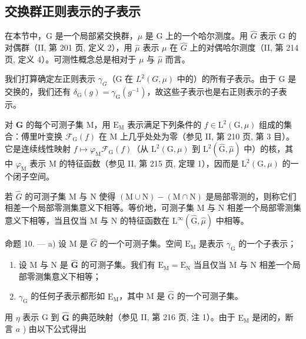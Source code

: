 \subsection{交换群正则表示的子表示}

在本节中，G 是一个局部紧交换群，\(\mu\) 是 G 上的一个哈尔测度。用 \(\hat{G}\) 表示 G 的对偶群（II, 第 201 页, 定义 2），用 \(\hat{\mu}\) 表示 \(\mu\) 在 \(\hat{G}\) 上的对偶哈尔测度（II, 第 214 页, 定义 4）。可测性概念总是相对于 \(\mu\) 与 \(\hat{\mu}\) 而言。

我们打算确定左正则表示 \(\gamma_{G}\)（G 在 \(L^{2}(G,\mu)\) 中的）的所有子表示。由于 G 是交换的，我们还有 \(\delta_{\mathrm{G}}(g)=\gamma_{\mathrm{G}}(g^{-1})\)，故这些子表示也是右正则表示的子表示。

对 \(\widehat{\mathbf{G}}\) 的每个可测子集 M，用 \(\mathrm{E_M}\) 表示满足下列条件的 \(f \in \mathrm{L}^2 (\mathrm{G},\mu)\) 组成的集合：傅里叶变换 \(\mathcal{F}_{\mathrm{G}}(f)\) 在 M 上几乎处处为零（参见 II, 第 210 页, 第 3 目）。它是连续线性映射 \(f \mapsto \varphi_{\mathrm{M}}\mathcal{F}_{\mathrm{G}}(f)\)（从 \(\mathrm{L}^2 (\mathrm{G},\mu)\) 到 \(\mathrm{L}^2 (\widehat{\mathrm{G}},\widehat{\mu})\) 中）的核，其中 \(\varphi_{\mathrm{M}}\) 表示 M 的特征函数（参见 II, 第 215 页, 定理 1），因而是 \(\mathrm{L}^2 (\mathrm{G},\mu)\) 的一个闭子空间。

若 \(\widehat{G}\) 的可测子集 M 与 N 使得 \((\mathrm{M} \cup \mathrm{N}) - (\mathrm{M} \cap \mathrm{N})\) 是局部零测的，则称它们相差一个局部零测集意义下相等。等价地，可测子集 M 与 N 相差一个局部零测集意义下相等，当且仅当 M 与 N 的特征函数在 \(\mathrm{L}^{\infty}(\widehat{\mathrm{G}}, \widehat{\mu})\) 中相等。

命题 10. --- a) 设 M 是 \(\widehat{G}\) 的一个可测子集。空间 \(\mathrm{E}_{\mathrm{M}}\) 是表示 \(\gamma_{\mathrm{G}}\) 的一个子表示；

\begin{enumerate}
\def\labelenumi{\alph{enumi})}
\setcounter{enumi}{1}
\item
  设 M 与 N 是 \(\widehat{\mathbf{G}}\) 的可测子集。我们有 \(\mathrm{E_M} = \mathrm{E_N}\) 当且仅当 M 与 N 相差一个局部零测集意义下相等；
\item
  \(\gamma_{\mathrm{G}}\) 的任何子表示都形如 \(\mathrm{E}_{\mathrm{M}}\)，其中 M 是 \(\widehat{\mathrm{G}}\) 的一个可测子集。
\end{enumerate}

用 \(\eta\) 表示 G 到 \(\widehat{\mathbf{G}}\) 的典范映射（参见 II, 第 216 页, 注 1）。由于 \(\mathrm{E_M}\) 是闭的，断言 \(a\) ) 由以下公式得出

